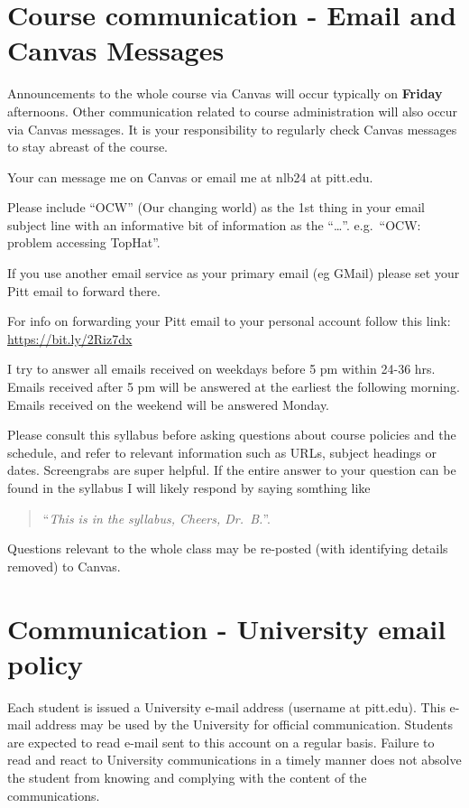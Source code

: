 \documentclass[
]{book}
\begin{document}
\hypertarget{email_and_canvas_msg}{%
\chapter{Course communication - Email and Canvas Messages}\label{email_and_canvas_msg}}

Announcements to the whole course via Canvas will occur typically on \textbf{Friday} afternoons. Other communication related to course administration will also occur via Canvas messages. It is your responsibility to regularly check Canvas messages to stay abreast of the course.

Your can message me on Canvas or email me at nlb24 at pitt.edu.

Please include ``OCW'' (Our changing world) as the 1st thing in your email subject line with an informative bit of information as the ``\ldots{}''. e.g.~``OCW: problem accessing TopHat''.

If you use another email service as your primary email (eg GMail) please set your Pitt email to forward there.

For info on forwarding your Pitt email to your personal account follow this link: \url{https://bit.ly/2Riz7dx}

I try to answer all emails received on weekdays before 5 pm within 24-36 hrs. Emails received after 5 pm will be answered at the earliest the following morning. Emails received on the weekend will be answered Monday.

Please consult this syllabus before asking questions about course policies and the schedule, and refer to relevant information such as URLs, subject headings or dates. Screengrabs are super helpful. If the entire answer to your question can be found in the syllabus I will likely respond by saying somthing like

\begin{quote}
``\emph{This is in the syllabus, Cheers, Dr.~B.}''.
\end{quote}

Questions relevant to the whole class may be re-posted (with identifying details removed) to Canvas.

\hypertarget{communication---university-email-policy}{%
\chapter{Communication - University email policy}\label{communication---university-email-policy}}

Each student is issued a University e-mail address (username at pitt.edu). This e-mail address may be used by the University for official communication. Students are expected to read e-mail sent to this account on a regular basis. Failure to read and react to University communications in a timely manner does not absolve the student from knowing and complying with the content of the communications.
\end{document}
